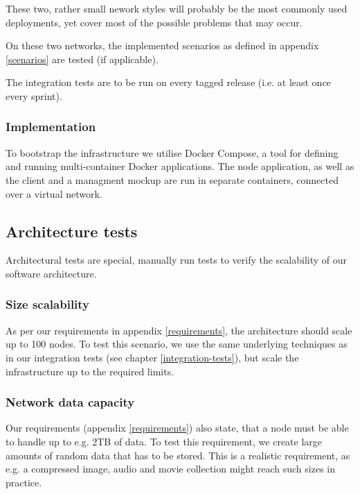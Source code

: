 These two, rather small nework styles will probably be the most commonly used deployments, yet cover most of the possible problems that may occur.

On these two networks, the implemented scenarios as defined in appendix \ref{scenarios} are tested (if applicable).

The integration tests are to be run on every tagged release (i.e. at least once every sprint).

\subsubsection{Implementation}

To bootstrap the infrastructure we utilise Docker Compose, a tool for defining and running multi-container Docker applications\cite{docker-compose}. The node application, as well as the client and a managment mockup are run in separate containers, connected over a virtual network.

\subsection{Architecture tests}

Architectural tests are special, manually run tests to verify the scalability of our software architecture.

\subsubsection{Size scalability}
As per our requirements in appendix \ref{requirements}, the architecture should scale up to 100 nodes. To test this scenario, we use the same underlying techniques as in our integration tests (see chapter \ref{integration-tests}), but scale the infrastructure up to the required limits.

\subsubsection{Network data capacity}
Our requirements (appendix \ref{requirements}) also state, that a node must be able to handle up to e.g. 2TB of data. To test this requirement, we create large amounts of random data that has to be stored. This is a realistic requirement, as e.g. a compressed image, audio and movie collection might reach such sizes in practice.
